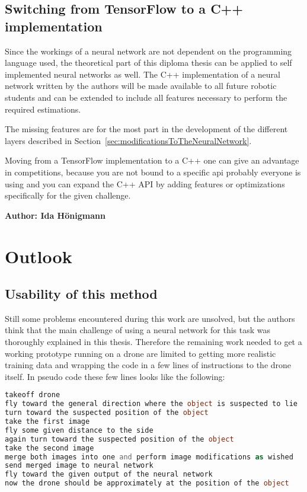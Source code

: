 \subsection{Switching from TensorFlow to a C++ implementation}
Since the workings of a neural network are not dependent on the programming language used, the theoretical part of this diploma thesis can be applied to self implemented neural networks as well. The C++ implementation of a neural network written by the authors will be made available to all future robotic students and can be extended to include all features necessary to perform the required estimations.

The missing features are for the most part in the development of the different layers described in Section~\ref{sec:modificationsToTheNeuralNetwork}.

Moving from a TensorFlow implementation to a C++ one can give an advantage in competitions, because you are not bound to a specific api probably everyone is using and you can expand the C++ API by adding features or optimizations specifically for the given challenge.

\newpage

\vspace{5mm}
\noindent
\textbf{Author: Ida Hönigmann}

\section{Outlook}

\subsection{Usability of this method}

Still some problems encountered during this work are unsolved, but the authors think that the main challenge of using a neural network for this task was thoroughly explained in this thesis. Therefore the remaining work needed to get a working prototype running on a drone are limited to getting more realistic training data and wrapping the code in a few lines of instructions to the drone itself. In pseudo code these few lines looks like the following:


\begin{lstlisting}[language=PHP]	%actually pseudo code, but php shows no syntax highlighting
takeoff drone
fly toward the general direction where the object is suspected to lie
turn toward the suspected position of the object
take the first image
fly some given distance to the side
again turn toward the suspected position of the object
take the second image
merge both images into one and perform image modifications as wished
send merged image to neural network
fly toward the given output of the neural network
now the drone should be approximately at the position of the object
\end{lstlisting}

